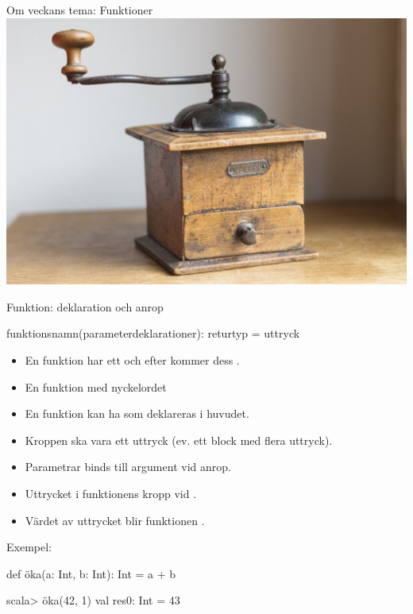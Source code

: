 	\begin{SlideExtra}{Om veckans tema: Funktioner}
		\includegraphics[width=1.0\textwidth]{../img/coffee-grinder}
	\end{SlideExtra}
\fi

\begin{Slide}{Funktion: deklaration och anrop}
	\SlideOnly{\setlength{\leftmargini}{0pt}}

	 funktionsnamn(parameterdeklarationer): returtyp = uttryck
	\vspace{0.5em}


	\begin{itemize}\SlideFontSmall
		\item En funktion har ett  och efter \code{=} kommer dess .
		\item En  funktion  med nyckelordet 
		\item En funktion kan ha  som deklareras i huvudet.
		\item Kroppen ska vara ett uttryck (ev. ett block med flera uttryck).
		\item Parametrar binds till argument vid anrop.
		\item Uttrycket i funktionens kropp  vid .
		\item Värdet av uttrycket blir funktionen .
	\end{itemize}

	\pause
	Exempel:
	\begin{Code}
		def öka(a: Int, b: Int): Int = a + b
	\end{Code}
	\pause
	\begin{REPLnonum}
		scala> öka(42, 1)
		val res0: Int = 43
	\end{REPLnonum}

\end{Slide}

